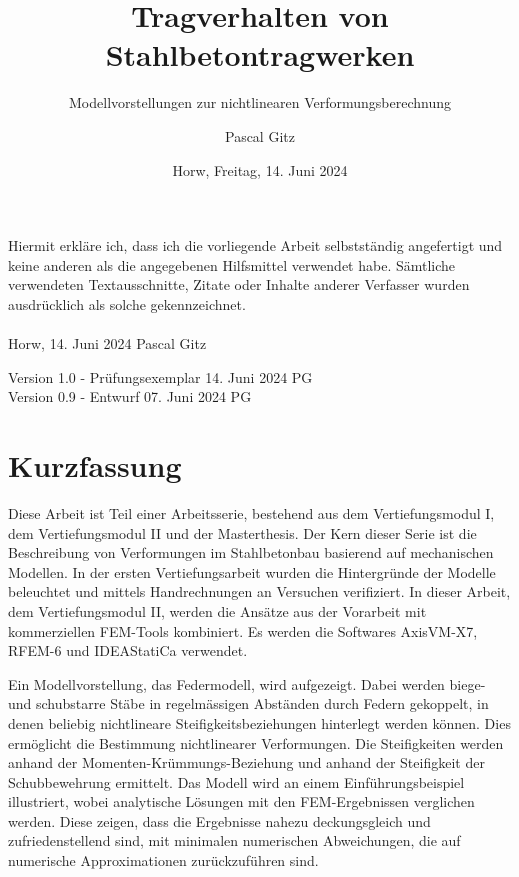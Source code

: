 \documentclass[
  11pt,
  letterpaper,
]{scrreprt}
\title{Tragverhalten von Stahlbetontragwerken}
\subtitle
{Modellvorstellungen zur nichtlinearen Verformungsberechnung}
\date{\large Horw, Freitag, 14. Juni 2024}
\author{Pascal Gitz}
\begin{document}
\maketitle


Hiermit erkläre ich, dass ich die vorliegende Arbeit selbstständig angefertigt und keine anderen als die angegebenen Hilfsmittel verwendet habe. Sämtliche verwendeten Textausschnitte, Zitate oder Inhalte anderer Verfasser wurden ausdrücklich als solche gekennzeichnet.\\%
%
\\%
%
Horw, 14. Juni 2024 \hfill Pascal Gitz%

\vfill

Version 1.0 - Prüfungsexemplar \hfill 14. Juni 2024 \quad \quad \quad \quad \quad PG\\
Version 0.9 - Entwurf \hfill 07. Juni 2024 \quad \quad \quad \quad \quad PG\\

\newpage

\chapter*{Kurzfassung}

Diese Arbeit ist Teil einer Arbeitsserie, bestehend aus dem Vertiefungsmodul I, dem Vertiefungsmodul II und der Masterthesis. Der Kern dieser Serie ist die Beschreibung von Verformungen im Stahlbetonbau basierend auf mechanischen Modellen. In der ersten Vertiefungsarbeit wurden die Hintergründe der Modelle beleuchtet und mittels Handrechnungen an Versuchen verifiziert. In dieser Arbeit, dem Vertiefungsmodul II, werden die Ansätze aus der Vorarbeit mit kommerziellen FEM-Tools kombiniert. Es werden die Softwares AxisVM-X7, RFEM-6 und IDEAStatiCa verwendet.

Ein Modellvorstellung, das Federmodell, wird aufgezeigt. Dabei werden biege- und schubstarre Stäbe in regelmässigen Abständen durch Federn gekoppelt, in denen beliebig nichtlineare Steifigkeitsbeziehungen hinterlegt werden können. Dies ermöglicht die Bestimmung nichtlinearer Verformungen. Die Steifigkeiten werden anhand der Momenten-Krümmungs-Beziehung und anhand der Steifigkeit der Schubbewehrung ermittelt. Das Modell wird an einem Einführungsbeispiel illustriert, wobei analytische Lösungen mit den FEM-Ergebnissen verglichen werden. Diese zeigen, dass die Ergebnisse nahezu deckungsgleich und zufriedenstellend sind, mit minimalen numerischen Abweichungen, die auf numerische Approximationen zurückzuführen sind.
\end{document}
